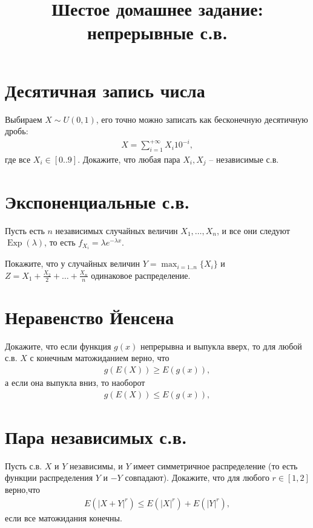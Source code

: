 \documentclass[12pt]{article}
\title{Шестое домашнее задание: непрерывные с.в.}
\DeclareMathOperator{\Exp}{Exp}
\begin{document}
\maketitle

\section{Десятичная запись числа}

Выбираем $X \sim U(0, 1)$, его точно можно записать как бесконечную десятичную дробь:
\begin{align*}
    X = \sum_{i = 1}^{+\infty} X_i 10^{-i},
\end{align*} 
где все $X_i \in [0..9]$. Докажите, что любая пара $X_i, X_j$ -- независимые с.в.

\section{Экспоненциальные с.в.}

Пусть есть $n$ независимых случайных величин $X_1, \dots, X_n$, и все они следуют $\Exp(\lambda)$, то есть $f_{X_i} = \lambda e^{-\lambda x}$.

Покажите, что у случайных величин $Y = \max_{i=1..n}\{X_i\}$ и $Z = X_1 + \frac{X_2}{2} + \dots + \frac{X_n}{n}$ одинаковое распределение.

\section{Неравенство Йенсена}

Докажите, что если функция $g(x)$ непрерывна и выпукла вверх, то для любой с.в. $X$ с конечным матожиданием верно, что
\begin{align*}
    g(E(X)) \ge E(g(x)), 
\end{align*} 
а если она выпукла вниз, то наоборот
\begin{align*}
    g(E(X)) \le E(g(x)), 
\end{align*} 

\section{Пара независимых с.в.}

Пусть с.в. $X$ и $Y$ независимы, и $Y$ имеет симметричное распределение (то есть функции распределения $Y$ и $-Y$ совпадают). Докажите, что для любого $r \in [1, 2]$ верно,что 
\begin{align*}
    E(|X + Y|^r) \le E(|X|^r) + E(|Y|^r),
\end{align*}
если все матожидания конечны.
\end{document}
